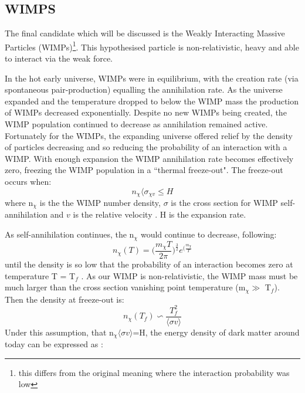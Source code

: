 \subsection{WIMPS}
\label{sec:wimp_as_a_candidate}
\par
The final candidate which will be discussed is the Weakly Interacting Massive Particles (WIMPs)\footnote{this differs from the original meaning where the interaction probability was low}.
This hypothesised particle is non-relativistic, heavy and able to interact via the weak force.
\par
In the hot early universe, WIMPs were in equilibrium, with the creation rate (via spontaneous pair-production) equalling the annihilation rate.
As the universe expanded and the temperature dropped to below the WIMP mass the production of WIMPs decreased exponentially.
Despite no new WIMPs being created, the WIMP population continued to decrease as annihilation remained active.
Fortunately for the WIMPs, the expanding universe offered relief by the density of particles decreasing and so reducing the probability of an interaction with a WIMP.
With enough expansion the WIMP annihilation rate becomes effectively zero, freezing the WIMP population in a ``thermal freeze-out".
The freeze-out occurs when:
\begin{equation}
    n_\chi \langle \sigma_{\chi v} \leq H
\end{equation}
where n$_\chi$ is the the WIMP number density, $\sigma$ is the cross section for WIMP self-annihilation and $v$ is the relative velocity \cite{wimp_theory_ref}.
H is the expansion rate.
\par
As self-annihilation continues, the n$_\chi$ would continue to decrease, following:
\begin{equation}
    n_\chi(T) = \bigg(\frac{m_\chi T}{2\pi}\bigg)^{\frac{3}{2}} e^{\bigg(\frac{m_\chi}{T}}
\end{equation}
until the density is so low that the probability of an interaction becomes zero at temperature T = T$_f$ \cite{wimp_theory_ref}.
As our WIMP is non-relativistic, the WIMP mass must be much larger than the cross section vanishing point temperature (m$_\chi \gg$ T$_f$).
Then the density at freeze-out is:
\begin{equation}
    n_\chi(T_f) \backsim \frac{T^2_f}{\langle \sigma v \rangle}
\end{equation}
Under this assumption, that n$_\chi \langle \sigma v \rangle$=H, the energy density of dark matter around today can be expressed as \cite{less_of_a_wimp_miracle_ref}:

